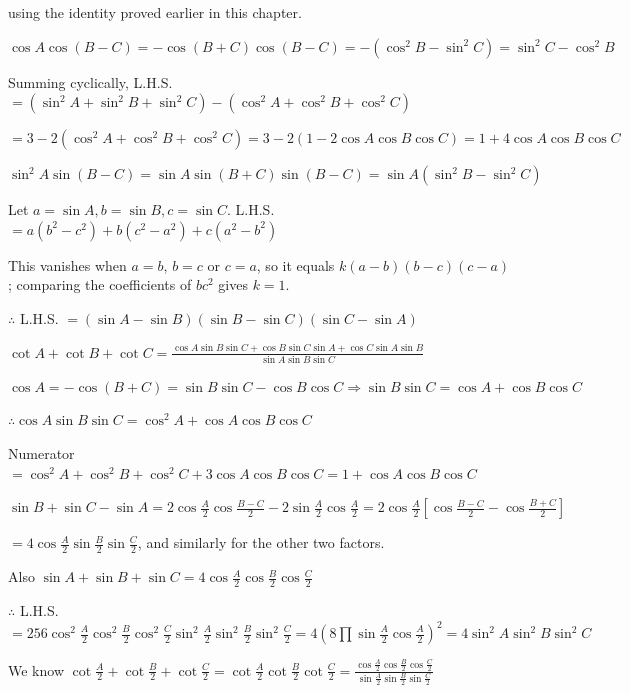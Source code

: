   using the identity proved earlier in this chapter.

\item $\cos A\cos(B - C) = -\cos(B + C)\cos(B - C) = -(\cos^2B - \sin^2C) = \sin^2C - \cos^2B$

  Summing cyclically, L.H.S. $= (\sin^2A + \sin^2B + \sin^2C) - (\cos^2A + \cos^2B + \cos^2C)$

  $= 3 - 2(\cos^2A + \cos^2B + \cos^2C) = 3 - 2(1 - 2\cos A\cos B\cos C) = 1 + 4\cos A\cos B\cos C$

\item $\sin^2A\sin(B - C) = \sin A\sin(B + C)\sin(B - C) = \sin A(\sin^2B - \sin^2C)$

  Let $a = \sin A, b = \sin B, c = \sin C$. L.H.S. $= a(b^2 - c^2) + b(c^2 - a^2) + c(a^2 - b^2)$

  This vanishes when $a = b$, $b = c$ or $c = a$, so it equals $k(a - b)(b - c)(c - a)$; comparing the coefficients of
  $bc^2$ gives $k = 1$.

  $\therefore$ L.H.S. $= (\sin A - \sin B)(\sin B - \sin C)(\sin C - \sin A)$

\item $\cot A + \cot B + \cot C = \frac{\cos A\sin B\sin C + \cos B\sin C\sin A + \cos C\sin A\sin B}{\sin A\sin B\sin
  C}$

  $\cos A = -\cos(B + C) = \sin B\sin C - \cos B\cos C \Rightarrow \sin B\sin C = \cos A + \cos B\cos C$

  $\therefore \cos A\sin B\sin C = \cos^2A + \cos A\cos B\cos C$

  Numerator $= \cos^2A + \cos^2B + \cos^2C + 3\cos A\cos B\cos C = 1 + \cos A\cos B\cos C$

\item $\sin B + \sin C - \sin A = 2\cos\frac{A}{2}\cos\frac{B - C}{2} - 2\sin\frac{A}{2}\cos\frac{A}{2} =
  2\cos\frac{A}{2}\left[\cos\frac{B - C}{2} - \cos\frac{B + C}{2}\right]$

  $= 4\cos\frac{A}{2}\sin\frac{B}{2}\sin\frac{C}{2}$, and similarly for the other two factors.

  Also $\sin A + \sin B + \sin C = 4\cos\frac{A}{2}\cos\frac{B}{2}\cos\frac{C}{2}$

  $\therefore$ L.H.S. $= 256\cos^2\frac{A}{2}\cos^2\frac{B}{2}\cos^2\frac{C}{2}\sin^2\frac{A}{2}\sin^2\frac{B}{2}
  \sin^2\frac{C}{2} = 4\left(8\prod\sin\frac{A}{2}\cos\frac{A}{2}\right)^2 = 4\sin^2A\sin^2B\sin^2C$

\item We know $\cot\frac{A}{2} + \cot\frac{B}{2} + \cot\frac{C}{2} = \cot\frac{A}{2}\cot\frac{B}{2}\cot\frac{C}{2} =
  \frac{\cos\frac{A}{2}\cos\frac{B}{2}\cos\frac{C}{2}}{\sin\frac{A}{2}\sin\frac{B}{2}\sin\frac{C}{2}}$

